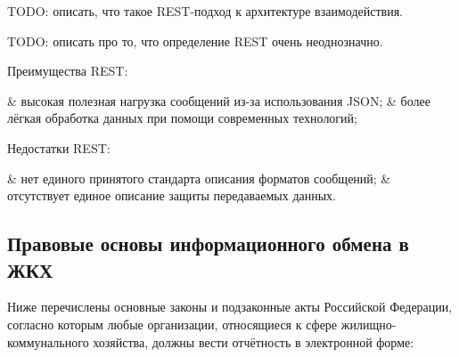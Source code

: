 TODO: описать, что такое REST-подход к архитектуре взаимодействия.

TODO: описать про то, что определение REST очень неоднозначно.

Преимущества REST:
\begin{easylist}
& высокая полезная нагрузка сообщений из-за использования JSON;
& более лёгкая обработка данных при помощи современных технологий;
\end{easylist}

Недостатки REST:
\begin{easylist}
& нет единого принятого стандарта описания форматов сообщений;
& отсутствует единое описание защиты передаваемых данных.
\end{easylist}

\subsection{Правовые основы информационного обмена в ЖКХ}

Ниже перечислены основные законы и подзаконные акты Российской Федерации, согласно которым любые организации, относящиеся к сфере жилищно-коммунального хозяйства, должны вести отчётность в электронной форме:

